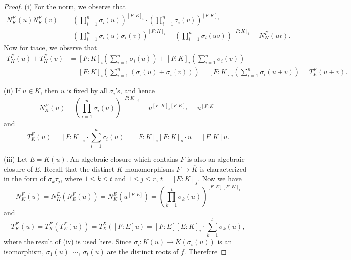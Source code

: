 \begin{proof}
(i) For the norm, we observe that 
$$
\begin{aligned}
N_{K}^{F}\left( u \right) N_{K}^{F}\left( v \right) &=\left( \prod_{i=1}^n{\sigma _i\left( u \right)} \right) ^{\left[ F:K \right] _i}\cdot \left( \prod_{i=1}^n{\sigma _i\left( v \right)} \right) ^{\left[ F:K \right] _i}
\\
&=\left( \prod_{i=1}^n{\sigma _i\left( u \right) \sigma _i\left( v \right)} \right) ^{\left[ F:K \right] _i}=\left( \prod_{i=1}^n{\sigma _i\left( uv \right)} \right) ^{\left[ F:K \right] _i}=N_{K}^{F}\left( uv \right) .
\end{aligned}
$$
Now for trace, we observe that 
$$
\begin{aligned}
T_{K}^{F}\left( u \right) +T_{K}^{F}\left( v \right) &=\left[ F:K \right] _i\left( \sum_{i=1}^n{\sigma _i\left( u \right)} \right) +\left[ F:K \right] _i\left( \sum_{i=1}^n{\sigma _i\left( v \right)} \right) 
\\
&=\left[ F:K \right] _i\left( \sum_{i=1}^n{\left( \sigma _i\left( u \right) +\sigma _i\left( v \right) \right)} \right) =\left[ F:K \right] _i\left( \sum_{i=1}^n{\sigma _i\left( u+v \right)} \right) =T_{K}^{F}\left( u+v \right) .
\end{aligned}
$$\par
(ii) If $u\in K$, then $u$ is fixed by all $\sigma_i$'s, and hence 
$$
N_{K}^{F}\left( u \right) =\left( \prod_{i=1}^n{\sigma _i\left( u \right)} \right) ^{\left[ F:K \right] _i}=u^{\left[ F:K \right] _s\left[ F:K \right] _i}=u^{\left[ F:K \right]}
$$
and 
$$
T_{K}^{F}\left( u \right) =\left[ F:K \right] _i\cdot \sum_{i=1}^n{\sigma _i\left( u \right)}=\left[ F:K \right] _i\left[ F:K \right] _s\cdot u=\left[ F:K \right] u.
$$\par
(iii) Let $E=K(u)$. An algebraic closure which contains $F$ is also an algebraic closure of $E$. Recall that the distinct $K$-monomorphisms $F\to\overline{K}$ is characterized in the form of $\sigma_k\tau_j$, where $1\le k\le t$ and $1\le j\le r$, $t=[E:K]_s$. Now we have 
$$
N_{K}^{F}\left( u \right) =N_{K}^{E}\left( N_{E}^{F}\left( u \right) \right) =N_{K}^{E}\left( u^{\left[ F:E \right]} \right) =\left( \prod_{k=1}^t{\sigma _k\left( u \right)} \right) ^{\left[ F:E \right] \left[ E:K \right] _i}
$$
and 
$$
T_{K}^{F}\left( u \right) =T_{K}^{E}\left( T_{E}^{F}\left( u \right) \right) =T_{K}^{E}\left( \left[ F:E \right] u \right) =\left[ F:E \right] \left[ E:K \right] _i\cdot \sum_{k=1}^t{\sigma _k\left( u \right)},
$$
where the result of (iv) is used here. Since $\sigma_i:K(u)\to K(\sigma_i(u))$ is an isomorphism, $\sigma_1(u)$, $\cdots$, $\sigma_t(u)$ are the distinct roots of $f$. Therefore 

\end{proof}
